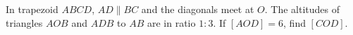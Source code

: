 In trapezoid $ABCD$, $AD\parallel BC$ and the diagonals meet at $O$. The altitudes of triangles $AOB$ and $ADB$ to $AB$ are in ratio $1:3$. If $[AOD]=6$, find $[COD]$.
